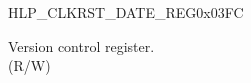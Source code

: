 \begin{register}{H}{LP\_CLKRST\_DATE\_REG}{0x03FC}\label{regdesc:LPCLKRSTDATEREG}
%
%
\regnewline%
\begin{regdesc}\begin{reglist}
\label{fielddesc:LPCLKRSTCLKRSTDATE}\item [LP\_CLKRST\_CLKRST\_DATE] Version control register. \\ (R/W)
\end{reglist}\end{regdesc}
\end{register}

